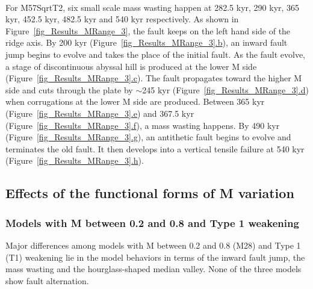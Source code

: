 ~\\
For M57SqrtT2, six small scale mass wasting happen at 282.5 kyr, 290 kyr, 365 kyr, 452.5 kyr, 482.5 kyr and 540 kyr respectively. As shown in Figure~\hyperref[fig_Results_MRange_3]{\ref{fig_Results_MRange_3}}, the fault keeps on the left hand side of the ridge axis. By 200 kyr (Figure~\hyperref[fig_Results_MRange_3]{\ref{fig_Results_MRange_3}.b}), an inward fault jump begins to evolve and takes the place of the initial fault. As the fault evolve, a stage of discontinuous abyssal hill is produced at the lower M side (Figure~\hyperref[fig_Results_MRange_3]{\ref{fig_Results_MRange_3}.c}). The fault propagates toward the higher M side and cuts through the plate by $\sim$245 kyr (Figure~\hyperref[fig_Results_MRange_3]{\ref{fig_Results_MRange_3}.d}) when corrugations at the lower M side are produced. Between 365 kyr (Figure~\hyperref[fig_Results_MRange_3]{\ref{fig_Results_MRange_3}.e}) and 367.5 kyr (Figure~\hyperref[fig_Results_MRange_3]{\ref{fig_Results_MRange_3}.f}), a mass wasting happens. By 490 kyr (Figure~\hyperref[fig_Results_MRange_3]{\ref{fig_Results_MRange_3}.g}), an antithetic fault begins to evolve and terminates the old fault. It then develops into a vertical tensile failure at 540 kyr (Figure~\hyperref[fig_Results_MRange_3]{\ref{fig_Results_MRange_3}.h}).
\fi














\iffalse
\subsection{Effects of the functional forms of M variation}

\subsubsection{Models with M between 0.2 and 0.8 and Type 1 weakening}

Major differences among models with M between 0.2 and 0.8 (M28) and Type 1 (T1) weakening lie in the model behaviors in terms of the inward fault jump, the mass wasting and the hourglass-shaped median valley. None of the three models show fault alternation.    

